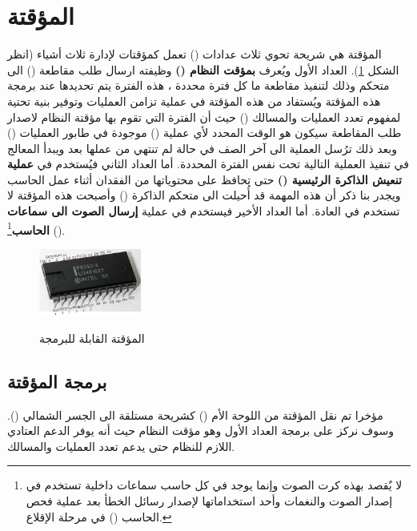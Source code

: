 \documentclass[document.tex]{subfiles}
\begin{document}
\section{المؤقتة }
المؤقتة هي شريحة  تحوي ثلاث عدادات () تعمل كمؤقتات لإدارة ثلاث أشياء (انظر الشكل \ref{fig:pit}). العداد الأول ويُعرف \textbf{بمؤقت النظام ()} وظيفته ارسال طلب مقاطعة () الى متحكم  وذلك لتنفيذ مقاطعة ما كل فترة محددة ، هذه الفترة يتم تحديدها عند برمجة هذه المؤقتة ويُستفاد من هذه المؤقتة في عملية تزامن العمليات وتوفير بنية تحتية لمفهوم تعدد العمليات والمسالك () حيث أن الفترة التي تقوم بها مؤقتة النظام لاصدار طلب المقاطعة سيكون هو الوقت المحدد لأي عملية () موجودة في طابور العمليات () وبعد ذلك ترُسل العملية الى آخر الصف في حالة لم تنتهي من عملها بعد ويبدأ المعالج في تنفيذ العملية التالية تحت نفس الفترة المحددة.  أما العداد الثاني فيُستخدم في \textbf{عملية تنعيش الذاكرة الرئيسية ()} حتى تحافظ على محتوياتها من الفقدان أثناء عمل الحاسب ويجدر بنا ذكر أن هذه المهمة قد أُحيلت الى متحكم الذاكرة () وأصبحت هذه المؤقتة لا تستخدم في العادة. أما العداد الأخير فيستخدم في عملية \textbf{إرسال الصوت الى سماعات الحاسب}\footnote{لا يٌقصد بهذه كرت الصوت وإنما يوجد في كل حاسب سماعات داخلية تستخدم في إصدار الصوت والنغمات وأحد استخداماتها لإصدار رسائل الخطأ بعد عملية فحص الحاسب () في مرحلة الإقلاع.} ().

\begin{figure}[h!]
  \caption{المؤقتة القابلة للبرمجة }
  \centering
   \includegraphics[width=0.3\textwidth]{../img/Intel-P8253-5}
  \label{fig:pit} 
\end{figure}

\subsection{برمجة المؤقتة }
مؤخرا تم نقل المؤقتة من اللوحة الأم () كشريحة  مستلقة الى الجسر الشمالي (). وسوف نركز على برمجة العداد الأول وهو مؤقت النظام حيث أنه يوفر الدعم العتادي اللازم للنظام حتى يدعم تعدد العمليات والمسالك.
\end{document}
